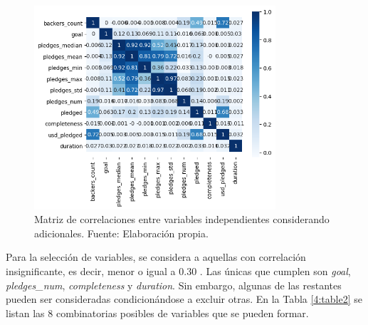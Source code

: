 \begin{figure}[!ht]
	\begin{center}
		\includegraphics[width=0.8\textwidth]{4/figures/metadata correlation v2.png}
		\caption{Matriz de correlaciones entre variables independientes considerando adicionales. Fuente: Elaboración propia.}
		\label{4:fig31}
	\end{center}
\end{figure}

Para la selección de variables, se considera a aquellas con correlación insignificante, es decir, menor o igual a 0.30 \parencite{tec_mukaka2012correlation}. Las únicas que cumplen son \textit{goal}, \textit{pledges\_num}, \textit{completeness} y \textit{duration}. Sin embargo, algunas de las restantes pueden ser consideradas condicionándose a excluir otras. En la Tabla \ref{4:table2} se listan las 8 combinatorias posibles de variables que se pueden formar.

